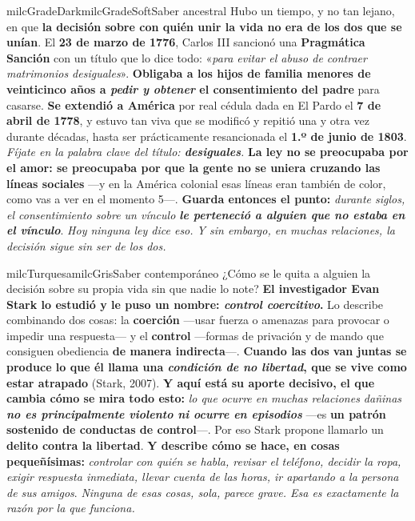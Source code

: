 \documentclass[11pt,letterpaper]{article}
\begin{document}
\begin{softbox}{milcGradeDark}{milcGradeSoft}{Saber ancestral}
Hubo un tiempo, y no tan lejano, en que \textbf{la decisión sobre con quién unir la vida no era de los dos que se unían}. El \textbf{23 de marzo de 1776}, Carlos III sancionó una \textbf{Pragmática Sanción} con un título que lo dice todo: «\emph{para evitar el abuso de contraer matrimonios desiguales}». \textbf{Obligaba a los hijos de familia menores de veinticinco años a \emph{pedir y obtener} el consentimiento del padre} para casarse. \textbf{Se extendió a América} por real cédula dada en El Pardo el \textbf{7 de abril de 1778}, y estuvo tan viva que se modificó y repitió una y otra vez durante décadas, hasta ser prácticamente resancionada el \textbf{1.º de junio de 1803}. \emph{Fíjate en la palabra clave del título: \textbf{desiguales}.} \textbf{La ley no se preocupaba por el amor: se preocupaba por que la gente no se uniera cruzando las líneas sociales} ---y en la América colonial esas líneas eran también de color, como vas a ver en el momento 5---. \textbf{Guarda entonces el punto:} \emph{durante siglos, el consentimiento sobre un vínculo \textbf{le perteneció a alguien que no estaba en el vínculo}}. \emph{Hoy ninguna ley dice eso. Y sin embargo, en muchas relaciones, la decisión sigue sin ser de los dos.}
\end{softbox}

\begin{softbox}{milcTurquesa}{milcGris}{Saber contemporáneo}
¿Cómo se le quita a alguien la decisión sobre su propia vida sin que nadie lo note? \textbf{El investigador Evan Stark lo estudió y le puso un nombre: \emph{control coercitivo}.} Lo describe combinando dos cosas: la \textbf{coerción} ---usar fuerza o amenazas para provocar o impedir una respuesta--- y el \textbf{control} ---formas de privación y de mando que consiguen obediencia \textbf{de manera indirecta}---. \textbf{Cuando las dos van juntas se produce lo que él llama una \emph{condición de no libertad}, que se vive como estar atrapado} (Stark, 2007). \textbf{Y aquí está su aporte decisivo, el que cambia cómo se mira todo esto:} \emph{lo que ocurre en muchas relaciones dañinas \textbf{no es principalmente violento ni ocurre en episodios}} ---es \textbf{un patrón sostenido de conductas de control}---. Por eso Stark propone llamarlo un \textbf{delito contra la libertad}. \textbf{Y describe cómo se hace, en cosas pequeñísimas:} \emph{controlar con quién se habla, revisar el teléfono, decidir la ropa, exigir respuesta inmediata, llevar cuenta de las horas, ir apartando a la persona de sus amigos}. \emph{Ninguna de esas cosas, sola, parece grave. Esa es exactamente la razón por la que funciona.}
\end{softbox}
\end{document}
